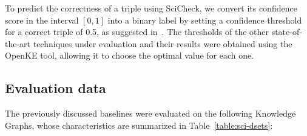 To predict the correctness of a triple using SciCheck, we convert its confidence score in the interval $[0, 1]$ into a binary label by setting a confidence threshold for a correct triple of 0.5, as suggested in~\cite{borrego2021}. The thresholds of the other state-of-the-art techniques under evaluation and their results were obtained using the OpenKE tool, allowing it to choose the optimal value for each one.

\subsection{Evaluation data}
The previously discussed baselines were evaluated on the following Knowledge Graphs, whose characteristics are summarized in Table~\ref{table:sci-dsets}:



